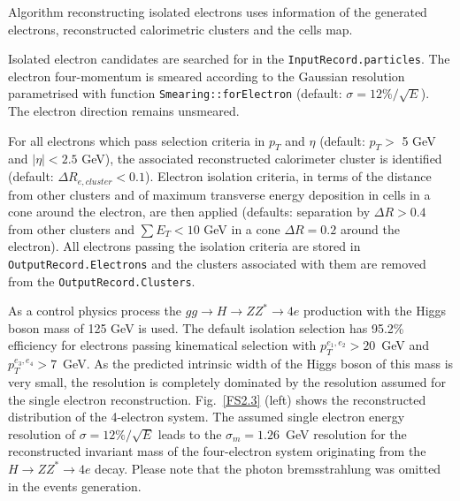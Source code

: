 Algorithm reconstructing isolated electrons uses information
of the generated electrons, reconstructed calorimetric clusters and
the cells map.

Isolated electron candidates are searched for in the 
{\tt InputRecord.particles}. The electron four-momentum is
smeared according to the Gaussian resolution parametrised with
function {\tt Smearing::forElectron} (default: $\sigma = 12\%/\sqrt{E}$).
 The electron direction remains unsmeared.

For all electrons which pass selection criteria in $p_T$ and $\eta$
(default: $p_T >$ 5 GeV and $|\eta| < 2.5$ GeV), the associated 
reconstructed  calorimeter cluster is identified (default: $\Delta
R_{e, cluster} < 0.1$). Electron isolation criteria, in terms of
the distance from other clusters and of maximum transverse energy 
deposition in cells in a cone around the electron, are then applied
(defaults: separation by $\Delta R > 0.4$ from other clusters and
$\sum E_T < 10$ GeV in a cone  $\Delta R = 0.2$ around the electron).
All electrons passing the isolation criteria are stored in 
{\tt OutputRecord.Electrons} and the clusters associated with them are
removed from the {\tt  OutputRecord.Clusters}. 

As a control physics process  the
 $gg \to H \to ZZ^* \to 4e $ production with the 
Higgs boson mass of 125 GeV is used. The default
isolation selection has 95.2\% efficiency for electrons passing
kinematical selection  with 
$p_T^{e_1, e_2} > 20$~GeV and $p_T^{e_3, e_4} > 7$~GeV.
As the predicted intrinsic width
of the Higgs boson of this mass is very small, the resolution is
completely dominated by the resolution assumed for the 
single electron reconstruction. Fig.~\ref{FS2.3} (left) shows the
reconstructed distribution of the 4-electron system.
The assumed single electron energy resolution of $\sigma = 12\%/\sqrt{E}$
leads to the $\sigma_m = 1.26$~GeV resolution for the reconstructed invariant mass
of the four-electron system originating from the $ H \to ZZ^* \to 4e $
decay. Please note that the photon bremsstrahlung
was omitted in the events generation.



